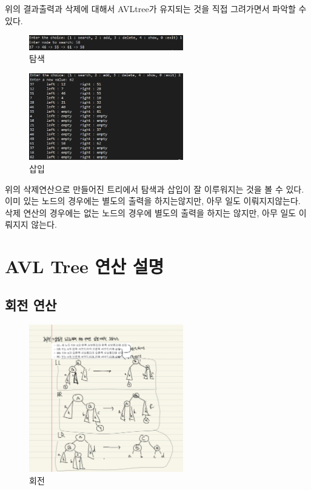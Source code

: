\documentclass[a4paper,11pt]{article}
\begin{document}
위의 결과출력과 삭제에 대해서 AVLtree가 유지되는 것을 직접 그려가면서 파악할 수 있다.\\\newpage

\begin{figure}[h]
\begin{center}
\includegraphics[width=0.6\textwidth]{search}
\caption{탐색}
\label{fig:fig4}
\end{center}
\end{figure}

\begin{figure}[h]
\begin{center}
\includegraphics[width=0.6\textwidth]{insert}
\caption{삽입}
\label{fig:fig2}
\end{center}
\end{figure}

위의 삭제연산으로 만들어진 트리에서 탐색과 삽입이 잘 이루워지는 것을 볼 수 있다. 이미 있는 노드의 경우에는 별도의 출력을 하지는않지만, 아무 일도 이뤄지지않는다. 삭제 연산의 경우에는 없는 노드의 경우에 별도의 출력을 하지는 않지만, 아무 일도 이뤄지지 않는다.
\newpage
\section{AVL Tree 연산 설명}
\subsection{회전 연산}
 
\begin{figure}[h]
\begin{center}
\includegraphics[width=0.6\textwidth]{Rotate}
\caption{회전}
\label{fig:fig2}
\end{center}
\end{figure}
\end{document}

